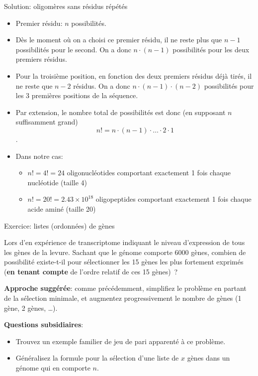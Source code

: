 \documentclass[ignorenonframetext,]{beamer}
\providecommand{\tightlist}{%
  \setlength{\itemsep}{0pt}\setlength{\parskip}{0pt}}
\begin{document}
\begin{frame}{Solution: oligomères sans résidus répétés}

\begin{itemize}
\item
  Premier résidu: \(n\) possibilités.
\item
  Dès le moment où on a choisi ce premier résidu, il ne reste plus que
  \(n-1\) possibilités pour le second. On a donc \(n \cdot (n-1)\)
  possibilités pour les deux premiers résidus.
\item
  Pour la troisième position, en fonction des deux premiers résidus déjà
  tirés, il ne reste que \(n-2\) résidus. On a donc
  \(n \cdot (n-1) \cdot (n-2)\) possibilités pour les 3 premières
  positions de la séquence.
\item
  Par extension, le nombre total de possibilités est donc (en supposant
  \(n\) suffisamment grand)
  \[n! = n \cdot (n-1) \cdot \ldots \cdot 2 \cdot 1\].
\item
  Dans notre cas:

  \begin{itemize}
  \tightlist
  \item
    \(n! = 4! = 24\) oligonucléotides comportant exactement 1 fois
    chaque nucléotide (taille 4)
  \item
    \(n! = 20! = 2.43\times 10^{18}\) oligopeptides comportant
    exactement 1 fois chaque acide aminé (taille 20)
  \end{itemize}
\end{itemize}

\end{frame}

\begin{frame}{Exercice: listes (ordonnées) de gènes}

Lors d'en expérience de transcriptome indiquant le niveau d'expression
de tous les gènes de la levure. Sachant que le génome comporte 6000
gènes, combien de possibilité existe-t-il pour sélectionner les 15 gènes
les plus fortement exprimés (\textbf{en tenant compte} de l'ordre
relatif de ces 15 gènes)~?

\textbf{Approche suggérée}: comme précédemment, simplifiez le problème
en partant de la sélection minimale, et augmentez progressivement le
nombre de gènes (1 gène, 2 gènes, \ldots{}).

\textbf{Questions subsidiaires}:

\begin{itemize}
\tightlist
\item
  Trouvez un exemple familier de jeu de pari apparenté à ce problème.
\item
  Généralisez la formule pour la sélection d'une liste de \(x\) gènes
  dans un génome qui en comporte \(n\).
\end{itemize}

\end{frame}
\end{document}
